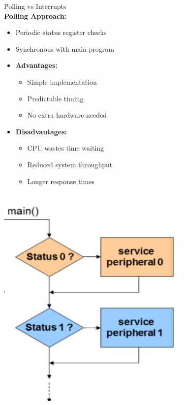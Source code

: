 \begin{concept}{Polling vs Interrupts}\\
\textbf{Polling Approach:}
\begin{itemize}
  \item Periodic status register checks
  \item Synchronous with main program
  \item \textbf{Advantages:}
    \begin{itemize}
      \item Simple implementation
      \item Predictable timing
      \item No extra hardware needed
    \end{itemize}
  \item \textbf{Disadvantages:}
    \begin{itemize}
      \item CPU wastes time waiting
      \item Reduced system throughput
      \item Longer response times
    \end{itemize}
\end{itemize}

\includegraphics[width=\linewidth]{images/2024_12_29_79e6b22f503fb7b4f718g-11(1)}


\end{concept}
